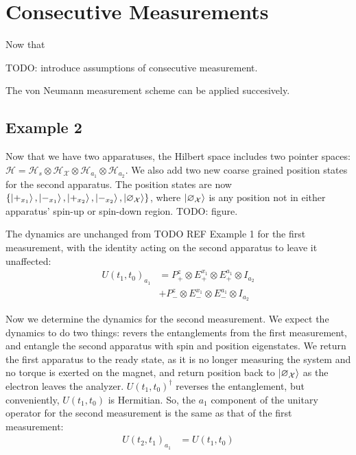 \section{Consecutive Measurements}

Now that

TODO: introduce assumptions of consecutive measurement.

The von Neumann measurement scheme can be applied succesively.

\subsection{Example 2}
Now that we have two apparatuses, the Hilbert space includes two pointer spaces: $\mathcal{H} = \mathcal{H}_s \otimes \mathcal{H}_\mathcal{X} \otimes \mathcal{H}_{a_1} \otimes \mathcal{H}_{a_2}$. We also add two new coarse grained position states for the second apparatus. The position states are now $\{\ket{+_{x_1}}, \ket{-_{x_1}}, \ket{+_{x_2}}, \ket{-_{x_2}}, \ket{\varnothing_\mathcal{X}}\}$, where $\ket{\varnothing_\mathcal{X}}$ is any position not in either apparatus' spin-up or spin-down region. TODO: figure.

The dynamics are unchanged from TODO REF Example 1 for the first measurement, with the identity acting on the second apparatus to leave it unaffected:
\begin{align}
  U(t_1, t_0)_{a_1} &= P^z_+ \otimes E^{x_1}_+  \nonumber \otimes E^{a_1}_+ \otimes I_{a_2}\\ \nonumber
  &+ P^z_- \otimes E^{x_1}_-\otimes E^{a_1}_- \otimes I_{a_2}
\end{align}

Now we determine the dynamics for the second measurement. We expect the dynamics to do two things: revers the entanglements from the first measurement, and entangle the second apparatus with spin and position eigenstates. We return the first apparatus to the ready state, as it is no longer measuring the system and no torque is exerted on the magnet, and return position back to $\ket{\varnothing_\mathcal{X}}$ as the electron leaves the analyzer. $U(t_1, t_0)^\dagger$ reverses the entanglement, but conveniently, $U(t_1, t_0)$ is Hermitian. So, the $a_1$ component of the unitary operator for the second measurement is the same as that of the first measurement:
\begin{align}
  U(t_2, t_1)_{a_1} &= U(t_1, t_0)
\end{align}

